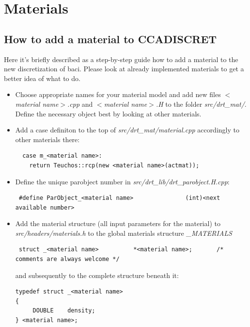 



\chapter{Materials}

\section{How to add a material to CCADISCRET}
Here it's briefly described as a step-by-step guide how to add a material to the new discretization of baci. Please look at already implemented materials to get a better idea of what to do.

\begin{itemize}
 \item Choose appropriate names for your material model and add new files \textit{$<$material name$>$.cpp} and \textit{$<$material name$>$.H} to the folder \textit{src/drt\_mat/}. Define the necessary object best by looking at other materials.

\item Add a case definiton to the top of \textit{src/drt\_mat/material.cpp} accordingly to other materials there:
\begin{verbatim}
  case m_<material name>:
    return Teuchos::rcp(new <material name>(actmat));
\end{verbatim}

\item Define the unique parobject number in \textit{src/drt\_lib/drt\_parobject.H.cpp}:
\begin{verbatim}
 #define ParObject_<material name>               (int)<next available number>
\end{verbatim}

\item Add the material structure (all input parameters for the material) to \textit{src/headers/materials.h} to the global materials structure \textit{\_MATERIALS} 
\begin{verbatim}
 struct _<material name>          *<material name>;       /* comments are always welcome */
\end{verbatim}
and subsequently to the complete structure beneath it:
\begin{verbatim}
typedef struct _<material name>
{
     DOUBLE	   density;
} <material name>;
\end{verbatim}


\end{itemize}
